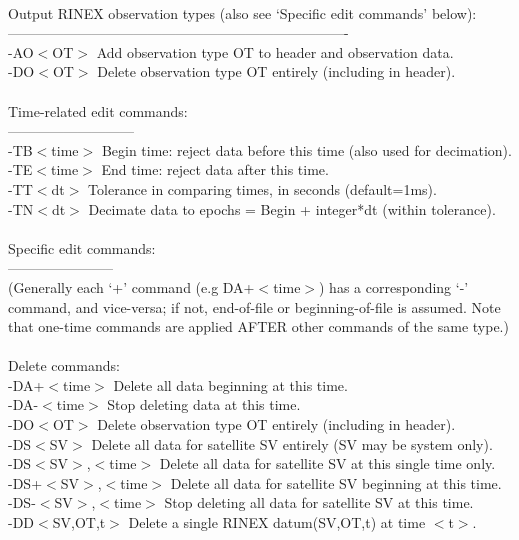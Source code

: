 \begin{\outputsize}
\\
 Output RINEX observation types (also see `Specific edit commands' below):\\
 -------------------------------------------------------------------------\\
 -AO$<$OT$>$         Add observation type OT to header and observation data.\\
 -DO$<$OT$>$         Delete observation type OT entirely (including in header).\\
\\
 Time-related edit commands:\\
 ---------------------------\\
 -TB$<$time$>$       Begin time: reject data before this time (also used for decimation).\\
 -TE$<$time$>$       End   time: reject data after this time.\\
 -TT$<$dt$>$         Tolerance in comparing times, in seconds (default=1ms).\\
 -TN$<$dt$>$         Decimate data to epochs = Begin + integer*dt (within tolerance).\\
\\
 Specific edit commands:\\
 -----------------------\\
 (Generally each `+' command (e.g DA+$<$time$>$) has a corresponding `-' command,
     and vice-versa; if not, end-of-file or beginning-of-file is assumed.
  Note that one-time commands are applied AFTER other commands of the same type.)\\
\\
 Delete commands:\\
 -DA+$<$time$>$      Delete all data beginning at this time.\\
 -DA-$<$time$>$      Stop deleting data at this time.\\
 -DO$<$OT$>$         Delete observation type OT entirely (including in header).\\
 -DS$<$SV$>$         Delete all data for satellite SV entirely (SV may be system only).\\
 -DS$<$SV$>$,$<$time$>$  Delete all data for satellite SV at this single time only.\\
 -DS+$<$SV$>$,$<$time$>$ Delete all data for satellite SV beginning at this time.\\
 -DS-$<$SV$>$,$<$time$>$ Stop deleting all data for satellite SV at this time.\\
 -DD$<$SV,OT,t$>$    Delete a single RINEX datum(SV,OT,t) at time $<$t$>$.\\

\end{\outputsize}
